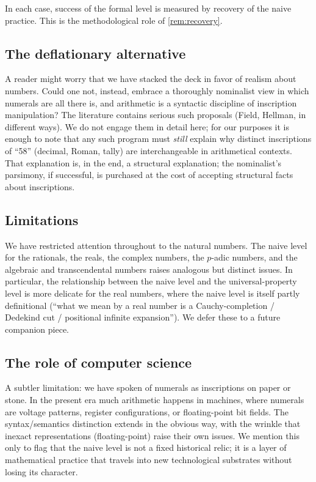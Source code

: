 \documentclass[12pt]{article}
\theoremstyle{definition}
\theoremstyle{remark}
\begin{document}
In each case, success of the formal level is measured by recovery of
the naive practice. This is the methodological role of \cref{rem:recovery}.

\subsection{The deflationary alternative}

A reader might worry that we have stacked the deck in favor of
realism about numbers. Could one not, instead, embrace a thoroughly
nominalist view in which numerals are all there is, and arithmetic is
a syntactic discipline of inscription manipulation? The literature
contains serious such proposals (Field, Hellman, in different ways).
We do not engage them in detail here; for our purposes it is enough to
note that any such program must \emph{still} explain why distinct
inscriptions of ``58'' (decimal, Roman, tally) are interchangeable in
arithmetical contexts. That explanation is, in the end, a structural
explanation; the nominalist's parsimony, if successful, is purchased
at the cost of accepting structural facts about inscriptions.

\subsection{Limitations}

We have restricted attention throughout to the natural numbers. The
naive level for the rationals, the reals, the complex numbers, the
$p$-adic numbers, and the algebraic and transcendental numbers raises
analogous but distinct issues. In particular, the relationship between
the naive level and the universal-property level is more delicate for
the real numbers, where the naive level is itself partly definitional
(``what we mean by a real number is a Cauchy-completion / Dedekind cut /
positional infinite expansion''). We defer these to a future companion
piece.

\subsection{The role of computer science}

A subtler limitation: we have spoken of numerals as inscriptions on
paper or stone. In the present era much arithmetic happens in machines,
where numerals are voltage patterns, register configurations, or
floating-point bit fields. The syntax/semantics distinction extends in
the obvious way, with the wrinkle that inexact representations
(floating-point) raise their own issues. We mention this only to flag
that the naive level is not a fixed historical relic; it is a layer of
mathematical practice that travels into new technological substrates
without losing its character.
\end{document}
